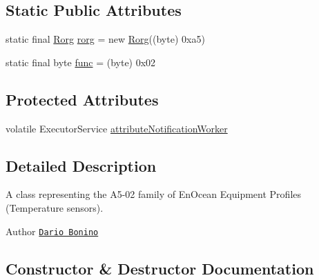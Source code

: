 \subsection*{Static Public Attributes}
\begin{DoxyCompactItemize}
\item 
static final \hyperlink{classit_1_1polito_1_1elite_1_1enocean_1_1enj_1_1eep_1_1_rorg}{Rorg} \hyperlink{classit_1_1polito_1_1elite_1_1enocean_1_1enj_1_1eep_1_1eep26_1_1_a5_1_1_a502_1_1_a502_af5b131f4f623e17ac161ed4e9c4b4d05}{rorg} = new \hyperlink{classit_1_1polito_1_1elite_1_1enocean_1_1enj_1_1eep_1_1_rorg}{Rorg}((byte) 0xa5)
\item 
static final byte \hyperlink{classit_1_1polito_1_1elite_1_1enocean_1_1enj_1_1eep_1_1eep26_1_1_a5_1_1_a502_1_1_a502_a2cd5818d6e738f68dd21890636d8f26e}{func} = (byte) 0x02
\end{DoxyCompactItemize}
\subsection*{Protected Attributes}
\begin{DoxyCompactItemize}
\item 
volatile Executor\+Service \hyperlink{classit_1_1polito_1_1elite_1_1enocean_1_1enj_1_1eep_1_1eep26_1_1_a5_1_1_a502_1_1_a502_ac0e3047c50cf4649d7dd140855601cbc}{attribute\+Notification\+Worker}
\end{DoxyCompactItemize}


\subsection{Detailed Description}
A class representing the A5-\/02 family of En\+Ocean Equipment Profiles (Temperature sensors).

\begin{DoxyAuthor}{Author}
\href{mailto:dario.bonino@gmail.com}{\tt Dario Bonino} 
\end{DoxyAuthor}


\subsection{Constructor \& Destructor Documentation}
\hypertarget{classit_1_1polito_1_1elite_1_1enocean_1_1enj_1_1eep_1_1eep26_1_1_a5_1_1_a502_1_1_a502_a88ad286c724ce0988c3bdcaec2e82cee}{}\label{classit_1_1polito_1_1elite_1_1enocean_1_1enj_1_1eep_1_1eep26_1_1_a5_1_1_a502_1_1_a502_a88ad286c724ce0988c3bdcaec2e82cee} 
